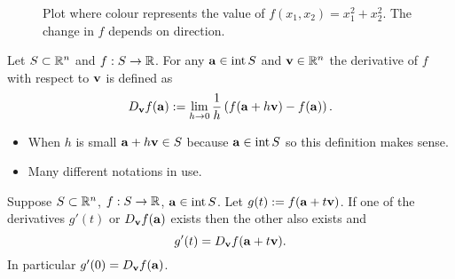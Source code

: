 \begin{figure}

    \caption{Plot where colour represents the value of \(f(x_1,x_2)=x_1^2 + x_2^2\). The change in \(f\) depends on direction.}
\end{figure}




\begin{definition}
    Let \(S\subset \bR^n\) and \(f:S\to \bR\).
    For any \(\aa \in \operatorname{int}S\) and \(\vv \in \bR^n\) the derivative of \(f\) with respect to \(\vv\) is defined as
    \[
        D_{\vv}f(\aa) :=
        \lim_{h\to 0} \frac{1}{h}\left(  f(\aa+h \vv) - f(\aa)     \right).
    \]
\end{definition}

\begin{itemize}
    \item
          When \(h\) is small \(\aa + h \vv \in S\) because \(\aa\in \operatorname{int} S\) so this definition makes sense.
    \item
          Many different notations in use.
\end{itemize}






\begin{theorem}
    Suppose \(S\subset \bR^n\), \(f:S\to \bR\), \(\aa \in \operatorname{int} S\).
    Let \(g(t) := f(\aa + t\vv)\).
    If one of the derivatives \(g'(t)\) or \(D_\vv f(\aa)\) exists then the other also exists and
    \[
        g'(t) = D_{\vv}f(\aa+t \vv).
    \]
    In particular \(g'(0) = D_{\vv}f(\aa)\).
\end{theorem}

